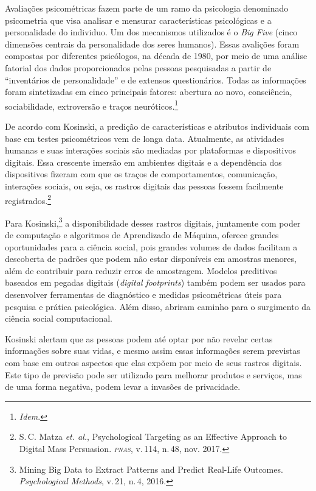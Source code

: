 Avaliações psicométricas fazem parte de um ramo da psicologia denominado
psicometria que visa analisar e mensurar características psicológicas e a personalidade do individuo. Um dos
mecanismos utilizados é o \textit{Big Five} (cinco dimensões centrais da
personalidade dos seres humanos). Essas avalições foram compostas por
diferentes psicólogos, na década de 1980, por meio de uma análise
fatorial dos dados proporcionados pelas pessoas pesquisadas a partir de
``inventários de personalidade'' e de extensos questionários. Todas
as informações foram sintetizadas em cinco principais fatores: abertura
ao novo, consciência, sociabilidade, extroversão e traços neuróticos.\footnote{\textit{Idem}.}

De acordo com Kosinski, a predição de características e
atributos individuais com base em testes psicométricos vem de longa
data. Atualmente, as atividades humanas e suas interações sociais são
mediadas por plataformas e dispositivos digitais. Essa crescente imersão
em ambientes digitais e a dependência dos dispositivos fizeram com que
os traços de comportamentos, comunicação, interações sociais, ou seja,
os rastros digitais das pessoas fossem facilmente registrados.\footnote{S.\,C. Matza  \textit{et. al.}, Psychological Targeting as an Effective Approach to Digital Mass
Persuasion. \textit{\textsc{pnas}}, v.\,114, n.\,48, nov. 2017.}

Para Kosinski,\footnote{Mining Big Data to Extract Patterns and Predict Real-Life
Outcomes. \textit{Psychological Methods}, v.\,21, n.\,4, 2016.} a disponibilidade desses rastros digitais,
juntamente com poder de computação e algoritmos de Aprendizado de
Máquina, oferece grandes oportunidades para a ciência social, pois
grandes volumes de dados facilitam a descoberta de padrões que podem não
estar disponíveis em amostras menores, além de contribuir para reduzir
erros de amostragem. Modelos preditivos baseados em pegadas digitais
(\textit{digital footprints}) também podem ser usados para desenvolver
ferramentas de diagnóstico e medidas psicométricas úteis para pesquisa e
prática psicológica. Além disso, abriram caminho para o surgimento da
ciência social computacional.

Kosinski alertam que as pessoas podem até optar por não
revelar certas informações sobre suas vidas, e mesmo assim essas
informações serem previstas com base em outros aspectos que elas expõem
por meio de seus rastros digitais. Este tipo de previsão pode ser
utilizado para melhorar produtos e serviços, mas de uma forma negativa,
podem levar a invasões de privacidade.

